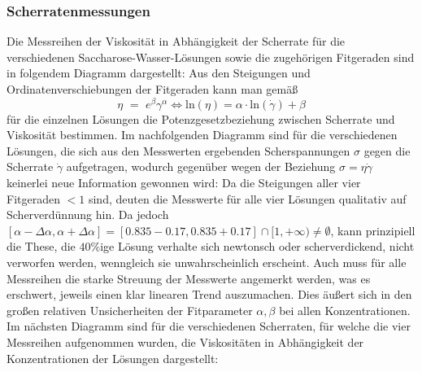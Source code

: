 \documentclass[11pt,a4paper,oneside]{scrartcl}
\begin{document}
\subsubsection{Scherratenmessungen}\label{suc_fehler}
Die Messreihen der Viskosität in Abhängigkeit der Scherrate für die verschiedenen Saccharose-Wasser-Lösungen sowie die zugehörigen Fitgeraden sind in folgendem Diagramm dargestellt:
 Aus den
Steigungen und Ordinatenverschiebungen der Fitgeraden kann man gemäß
\begin{equation}
\eta \,\,=\,\, e^{\beta} \gamma^{\alpha}\iff \mathrm{ln}\left(\eta\right)=\alpha\cdot\mathrm{ln}\left(\dot\gamma\right)+\beta
\end{equation}  für die einzelnen Lösungen die Potenzgesetzbeziehung zwischen Scherrate und Viskosität bestimmen.
Im nachfolgenden Diagramm sind für die verschiedenen Lösungen,
die sich aus den Messwerten ergebenden Scherspannungen $\sigma$ gegen die Scherrate $\dot{\gamma}$ aufgetragen, wodurch gegenüber  wegen der Beziehung $\sigma=\eta\dot\gamma$ keinerlei neue Information gewonnen wird:
Da die Steigungen aller vier Fitgeraden $<1$ sind, deuten die Messwerte für alle vier Lösungen qualitativ auf Scherverdünnung
hin. Da jedoch $[\alpha-\Delta\alpha,\alpha+\Delta\alpha]=[0.835-0.17,0.835+0.17]\cap[1,+\infty)\neq\emptyset$, kann prinzipiell die These, die $40\%$ige Lösung verhalte sich newtonsch oder scherverdickend, nicht  verworfen werden, wenngleich sie unwahrscheinlich erscheint. Auch muss für alle Messreihen die starke Streuung der Messwerte angemerkt werden, was es erschwert, jeweils einen klar linearen Trend auszumachen. Dies äußert sich in den großen relativen Unsicherheiten der Fitparameter $\alpha,\beta$ bei allen Konzentrationen.\\
 Im nächsten Diagramm sind für die verschiedenen Scherraten, für welche die vier Messreihen aufgenommen wurden, die Viskositäten in Abhängigkeit der Konzentrationen der Lösungen dargestellt: 
\end{document}
